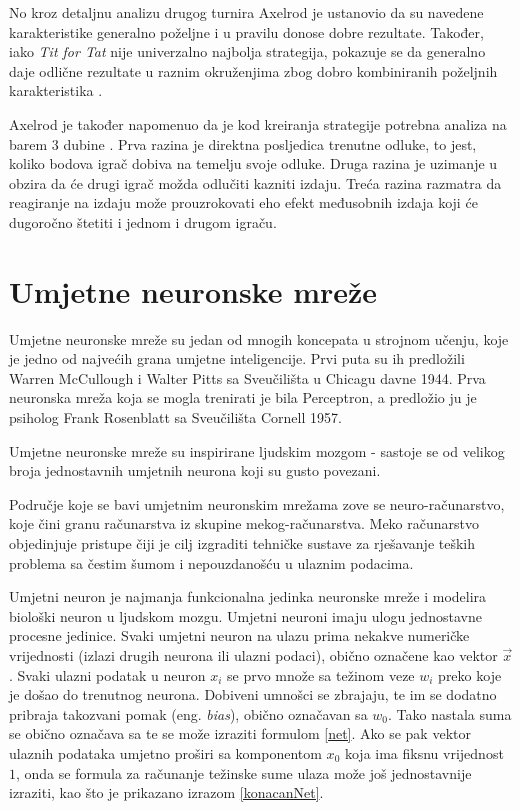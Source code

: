 \documentclass[zavrsnirad]{fer}
\begin{document}
		No kroz detaljnu analizu drugog turnira Axelrod je ustanovio da su navedene karakteristike generalno poželjne i u pravilu donose dobre rezultate. Također, iako \textit{Tit for Tat} nije univerzalno najbolja strategija, pokazuje se da generalno daje odlične rezultate u raznim okruženjima zbog dobro kombiniranih poželjnih karakteristika \cite{1980Axelrod2}.
	
		Axelrod je također napomenuo da je kod kreiranja strategije potrebna analiza na barem 3 dubine \cite{1980Axelrod1}. Prva razina je direktna posljedica trenutne odluke, to jest, koliko bodova igrač dobiva na temelju svoje odluke. Druga razina je uzimanje u obzira da će drugi igrač možda odlučiti kazniti izdaju. Treća razina razmatra da reagiranje na izdaju može prouzrokovati eho efekt međusobnih izdaja koji će dugoročno štetiti i jednom i drugom igraču.

\chapter{Umjetne neuronske mreže}
\label{pog:NeuronskeMreze}
	
	Umjetne neuronske mreže su jedan od mnogih koncepata u strojnom učenju, koje je jedno od najvećih grana umjetne inteligencije. Prvi puta su ih predložili Warren McCullough i Walter Pitts sa Sveučilišta u Chicagu davne 1944. Prva neuronska mreža koja se mogla trenirati je bila Perceptron, a predložio ju je psiholog Frank Rosenblatt sa Sveučilišta Cornell 1957. \cite{MITNeuralNet}
	
	Umjetne neuronske mreže su inspirirane ljudskim mozgom - sastoje se od velikog broja jednostavnih umjetnih neurona koji su gusto povezani. \cite{MITNeuralNet}
	
	Područje koje se bavi umjetnim neuronskim mrežama zove se neuro-računarstvo, koje čini granu računarstva iz skupine mekog-računarstva. Meko računarstvo objedinjuje pristupe čiji je cilj izgraditi tehničke sustave za rješavanje teških problema sa čestim šumom i nepouzdanošću u ulaznim podacima. \cite{skriptaNeuronskeMreze} 
	
	Umjetni neuron je najmanja funkcionalna jedinka neuronske mreže i modelira biološki neuron u ljudskom mozgu. Umjetni neuroni imaju ulogu jednostavne procesne jedinice. Svaki umjetni neuron na ulazu prima nekakve numeričke vrijednosti (izlazi drugih neurona ili ulazni podaci), obično označene kao vektor $\vec{x}$. Svaki ulazni podatak u neuron $x_i$ se prvo množe sa težinom veze $w_i$ preko koje je došao do trenutnog neurona. Dobiveni umnošci se zbrajaju, te im se dodatno pribraja takozvani pomak (eng. \textit{bias}), obično označavan sa $w_0$. Tako nastala suma se obično označava sa  te se može izraziti formulom \ref{net}. Ako se pak vektor ulaznih podataka umjetno proširi sa komponentom $x_0$ koja ima fiksnu vrijednost $1$, onda se formula za računanje težinske sume ulaza može još jednostavnije izraziti, kao što je prikazano izrazom \ref{konacanNet}.
	
\end{document}
